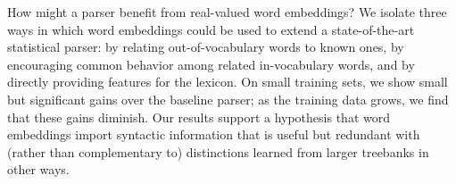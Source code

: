 How might a parser benefit from real-valued word embeddings? We isolate three ways in which word embeddings could be used to extend a state-of-the-art statistical parser: by relating out-of-vocabulary words to known ones, by encouraging common behavior among related in-vocabulary words, and by directly providing features for the lexicon. On small training sets, we show small but significant gains over the baseline parser; as the training data grows, we find that these gains diminish. Our results support a hypothesis that word embeddings import syntactic information that is useful but redundant with (rather than complementary to) distinctions learned from larger treebanks in other ways.
